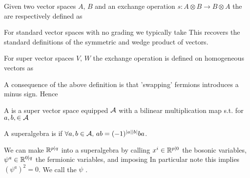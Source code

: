 \documentclass{article}
\begin{document}
\begin{definition}
	Given two vector spaces $A, \, B$ and an exchange operation $s : A \otimes B \to B \otimes A$ the  are respectively defined as 
\end{definition}

\begin{example}
	For standard vector spaces with no grading we typically take 
This recovers the standard definitions of the symmetric and wedge product of vectors. 
\end{example}

\begin{definition}
	For super vector spaces $V, \, W$ the exchange operation is defined on homogeneous vectors as 
\end{definition}

\begin{remark}
	A consequence of the above definition is that 'swapping' fermions introduces a minus sign. Hence 
\end{remark}

\begin{definition}
	A  is a super vector space equipped $\mathcal{A}$ with a bilinear multiplication map s.t. for $a,b, \in \mathcal{A}$
\end{definition}

\begin{definition}
	A superalgebra is  if $\forall a,b \in \mathcal{A}, \, ab = (-1)^{\left\lvert a \right\rvert\left\lvert b \right\rvert}ba$.
\end{definition}

\begin{example}
	We can make $\mathbb{R}^{p|q}$ into a superalgebra by calling $x^i \in \mathbb{R}^{p|0}$ the bosonic variables, $\psi^a \in \mathbb{R}^{0|q}$ the fermionic variables, and imposing 
In particular note this implies $(\psi^a)^2 =0$. We call the $\psi$ . 
\end{example}
\end{document}

